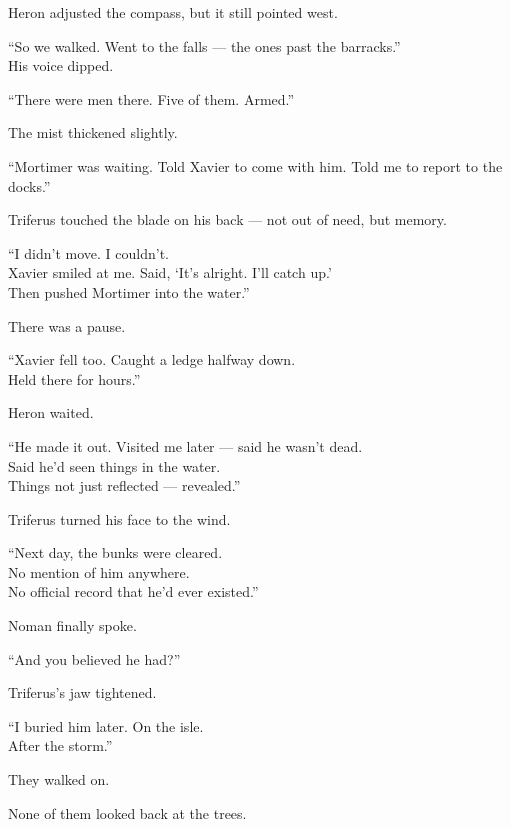 \documentclass[12pt]{article}
\begin{document}
Heron adjusted the compass, but it still pointed west.

“So we walked. Went to the falls — the ones past the barracks.”\\
His voice dipped.

“There were men there. Five of them. Armed.”

\vspace{1em}

The mist thickened slightly.

“Mortimer was waiting. Told Xavier to come with him. Told me to report to the docks.”

Triferus touched the blade on his back — not out of need, but memory.

“I didn’t move. I couldn’t.\\
Xavier smiled at me. Said, ‘It’s alright. I’ll catch up.’\\
Then pushed Mortimer into the water.”

\vspace{1em}

There was a pause.

“Xavier fell too. Caught a ledge halfway down.\\
Held there for hours.”

Heron waited.

“He made it out. Visited me later — said he wasn’t dead.\\
Said he’d seen things in the water.\\
Things not just reflected — revealed.”

\vspace{1em}

Triferus turned his face to the wind.

“Next day, the bunks were cleared.\\
No mention of him anywhere.\\
No official record that he’d ever existed.”

\vspace{1em}

Noman finally spoke.

“And you believed he had?”

Triferus’s jaw tightened.

“I buried him later. On the isle.\\
After the storm.”

\vspace{1em}

They walked on.

None of them looked back at the trees.
\end{document}
